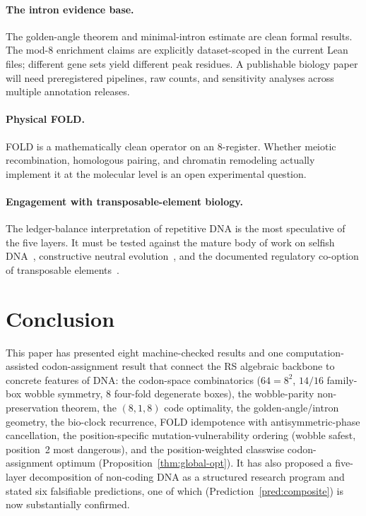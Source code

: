 \documentclass[11pt,a4paper]{article}
\begin{document}
\paragraph{The intron evidence base.}
The golden-angle theorem and minimal-intron estimate are clean formal results. The mod-8 enrichment claims are explicitly dataset-scoped in the current Lean files; different gene sets yield different peak residues. A publishable biology paper will need preregistered pipelines, raw counts, and sensitivity analyses across multiple annotation releases.

\paragraph{Physical FOLD.}
FOLD is a mathematically clean operator on an 8-register. Whether meiotic recombination, homologous pairing, and chromatin remodeling actually implement it at the molecular level is an open experimental question.

\paragraph{Engagement with transposable-element biology.}
The ledger-balance interpretation of repetitive DNA is the most speculative of the five layers. It must be tested against the mature body of work on selfish DNA~\cite{Orgel1980}, constructive neutral evolution~\cite{Stoltzfus1999}, and the documented regulatory co-option of transposable elements~\cite{Chuong2017}.

\section{Conclusion}
\label{sec:conclusion}

This paper has presented eight machine-checked results and one computation-assisted codon-assignment result that connect the RS algebraic backbone to concrete features of DNA: the codon-space combinatorics ($64 = 8^2$, $14/16$ family-box wobble symmetry, $8$ four-fold degenerate boxes), the wobble-parity non-preservation theorem, the $(8,1,8)$ code optimality, the golden-angle/intron geometry, the bio-clock recurrence, FOLD idempotence with antisymmetric-phase cancellation, the position-specific mutation-vulnerability ordering (wobble safest, position~2 most dangerous), and the position-weighted classwise codon-assignment optimum (Proposition~\ref{thm:global-opt}). It has also proposed a five-layer decomposition of non-coding DNA as a structured research program and stated six falsifiable predictions, one of which (Prediction~\ref{pred:composite}) is now substantially confirmed.
\end{document}
